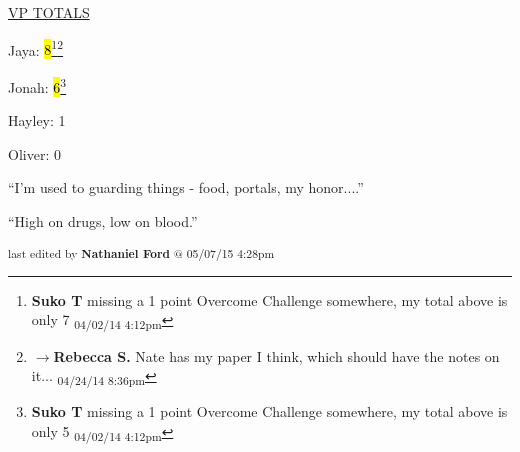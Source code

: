 \underline{  {\LARGE VP TOTALS }  }

Jaya: \hl{8}\footnote{\textbf{Suko T }missing a 1 point Overcome Challenge somewhere, my total above is only 7 \textsubscript{04/02/14 4:12pm}}\footnote{$\rightarrow$\textbf{Rebecca S. }Nate has my paper I think, which should have the notes on it... \textsubscript{04/24/14 8:36pm}}

Jonah: \hl{6}\footnote{\textbf{Suko T }missing a 1 point Overcome Challenge somewhere, my total above is only 5 \textsubscript{04/02/14 4:12pm}}

Hayley: 1

Oliver: 0





``I'm used to guarding things -  food, portals, my honor....''




``High on drugs, low on blood.''




\vspace{\fill}

\begin{flushright}
\textsubscript{last edited by \textbf{Nathaniel Ford} @ 05/07/15 4:28pm}
\end{flushright}

